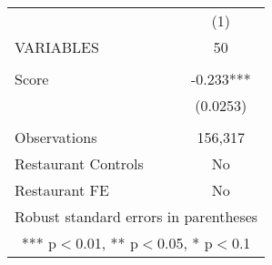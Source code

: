 \begin{tabular}{lc} \hline
 & (1) \\
VARIABLES & 50 \\ \hline
 &  \\
Score & -0.233*** \\
 & (0.0253) \\
 &  \\
Observations & 156,317 \\
Restaurant Controls & No \\
 Restaurant FE & No \\ \hline
\multicolumn{2}{c}{ Robust standard errors in parentheses} \\
\multicolumn{2}{c}{ *** p$<$0.01, ** p$<$0.05, * p$<$0.1} \\
\end{tabular}
